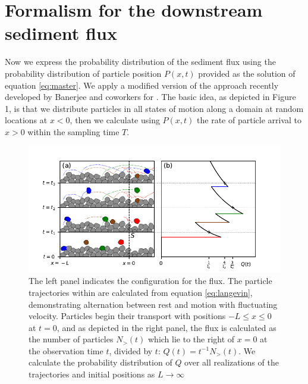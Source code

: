 \section{Formalism for the downstream sediment flux}
Now we express the probability distribution of the sediment flux using the probability distribution of particle position $P(x,t)$ provided as the solution of equation \ref{eq:master}. We apply a modified version of the approach recently developed by Banerjee and coworkers for \citep{Banerjee2020}. The basic idea, as depicted in Figure 1, is that we distribute particles in all states of motion along a domain at random locations at $x<0$, then we calculate using $P(x,t)$ the rate of particle arrival to $x>0$ within the sampling time $T$.
\begin{figure}
	\centerline{\includegraphics{./figures/ch2/figure1.pdf}}
	\caption{The left panel indicates the configuration for the flux. The particle trajectories within are calculated from equation \ref{eq:langevin}, demonstrating alternation between rest and motion with fluctuating velocity. Particles begin their transport with positions $-L\leq x \leq 0$ at $t=0$, and as depicted in the right panel, the flux is calculated as the number of particles $N_>(t)$ which lie to the right of $x=0$ at the observation time $t$, divided by $t$: $Q(t) = t^{-1}N_>(t)$. We calculate the probability distribution of $Q$ over all realizations of the trajectories and initial positions as $L\rightarrow \infty$}
	\label{fig:fig1}
\end{figure}

